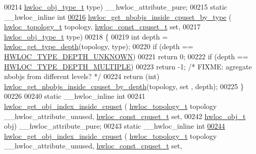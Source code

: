 \begin{DoxyCode}
00214                                         \hyperlink{a00184_gacd37bb612667dc437d66bfb175a8dc55}{hwloc\_obj\_type\_t} type) \_\_hwloc\_attribute\_pure;
00215 \textcolor{keyword}{static} \_\_hwloc\_inline \textcolor{keywordtype}{int}
\hyperlink{a00195_ga133c40415de008518608f8bff52a5ab9}{00216} \hyperlink{a00195_ga133c40415de008518608f8bff52a5ab9}{hwloc\_get\_nbobjs\_inside\_cpuset\_by\_type} (
      \hyperlink{a00186_ga9d1e76ee15a7dee158b786c30b6a6e38}{hwloc\_topology\_t} topology, \hyperlink{a00183_ga1f784433e9b606261f62d1134f6a3b25}{hwloc\_const\_cpuset\_t} \textcolor{keyword}{set},
00217                                         \hyperlink{a00184_gacd37bb612667dc437d66bfb175a8dc55}{hwloc\_obj\_type\_t} type)
00218 \{
00219   \textcolor{keywordtype}{int} depth = \hyperlink{a00187_ga8bec782e21be313750da70cf7428b374}{hwloc\_get\_type\_depth}(topology, type);
00220   \textcolor{keywordflow}{if} (depth == \hyperlink{a00187_ggaf4e663cf42bbe20756b849c6293ef575a0565ab92ab72cb0cec91e23003294aad}{HWLOC\_TYPE\_DEPTH\_UNKNOWN})
00221     \textcolor{keywordflow}{return} 0;
00222   \textcolor{keywordflow}{if} (depth == \hyperlink{a00187_ggaf4e663cf42bbe20756b849c6293ef575ae99465995cacde6c210d5fc2e409798c}{HWLOC\_TYPE\_DEPTH\_MULTIPLE})
00223     \textcolor{keywordflow}{return} -1; \textcolor{comment}{/* FIXME: agregate nbobjs from different levels? */}
00224   \textcolor{keywordflow}{return} (\textcolor{keywordtype}{int}) \hyperlink{a00195_gaa43c64512ddb33fd181990c4261cec7d}{hwloc\_get\_nbobjs\_inside\_cpuset\_by\_depth}(topology, \textcolor{keyword}{set}
      , depth);
00225 \}
00226 
00240 \textcolor{keyword}{static} \_\_hwloc\_inline \textcolor{keywordtype}{int}
00241 \hyperlink{a00195_ga4c3a20d61e9beb06c667b21688c772c5}{hwloc\_get\_obj\_index\_inside\_cpuset} (
      \hyperlink{a00186_ga9d1e76ee15a7dee158b786c30b6a6e38}{hwloc\_topology\_t} topology \_\_hwloc\_attribute\_unused, 
      \hyperlink{a00183_ga1f784433e9b606261f62d1134f6a3b25}{hwloc\_const\_cpuset\_t} \textcolor{keyword}{set},
00242                                    \hyperlink{a00238}{hwloc\_obj\_t} obj) \_\_hwloc\_attribute\_pure;
00243 \textcolor{keyword}{static} \_\_hwloc\_inline \textcolor{keywordtype}{int}
\hyperlink{a00195_ga4c3a20d61e9beb06c667b21688c772c5}{00244} \hyperlink{a00195_ga4c3a20d61e9beb06c667b21688c772c5}{hwloc\_get\_obj\_index\_inside\_cpuset} (
      \hyperlink{a00186_ga9d1e76ee15a7dee158b786c30b6a6e38}{hwloc\_topology\_t} topology \_\_hwloc\_attribute\_unused, 
      \hyperlink{a00183_ga1f784433e9b606261f62d1134f6a3b25}{hwloc\_const\_cpuset\_t} \textcolor{keyword}{set},

\end{DoxyCode}
